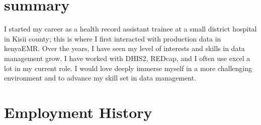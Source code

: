 \documentclass{brian_ats}
\begin{document}
\section{summary}
I started my career as a health record assistant trainee at a small district hospital in Kisii county; this is where I first interacted with production data in kenyaEMR. Over the years, I have seen my level of interests and skills in data management grow. I have worked with DHIS2, REDcap, and I often use excel a lot in my current role. I would love deeply immerse myself in a more challenging environment and to advance my skill set in data management.












\section{Employment History}
\end{document}
